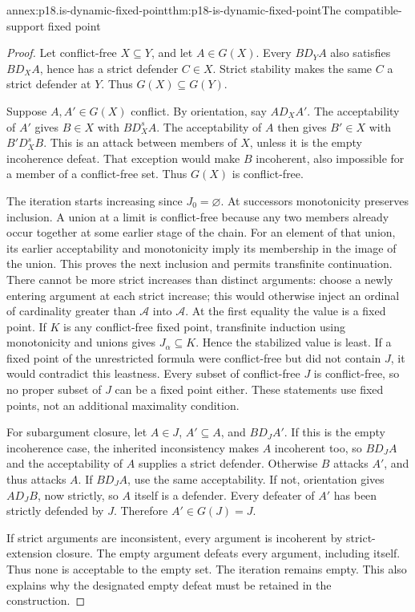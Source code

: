 \begin{annexitem}{annex:p18.is-dynamic-fixed-point}{thm:p18-is-dynamic-fixed-point}{The compatible-support fixed point}
\begin{proof}
Let conflict-free \(X\subseteq Y\), and let \(A\in G(X)\).
Every \(B D_YA\) also satisfies \(B D_XA\), hence has a
strict defender \(C\in X\). Strict stability makes the same \(C\)
a strict defender at \(Y\). Thus \(G(X)\subseteq G(Y)\).

Suppose \(A,A'\in G(X)\) conflict. By orientation, say \(A D_XA'\).
The acceptability of \(A'\) gives \(B\in X\) with \(B D_X^s A\).
The acceptability of \(A\) then gives \(B'\in X\) with
\(B'D_X^s B\). This is an attack between members of \(X\),
unless it is the empty incoherence defeat. That exception would
make \(B\) incoherent, also impossible for a member of a
conflict-free set. Thus \(G(X)\) is conflict-free.

The iteration starts increasing since \(J_0=\varnothing\).
At successors monotonicity preserves inclusion. A union at a
limit is conflict-free because any two members already occur
together at some earlier stage of the chain. For an element of
that union, its earlier acceptability and monotonicity imply its
membership in the image of the union. This proves the next
inclusion and permits transfinite continuation.
There cannot be more strict increases than distinct arguments:
choose a newly entering argument at each strict increase;
this would otherwise inject an ordinal of cardinality greater
than \(\mathcal A\) into \(\mathcal A\).
At the first equality the value is a fixed point.
If \(K\) is any conflict-free fixed point, transfinite induction
using monotonicity and unions gives \(J_\alpha\subseteq K\).
Hence the stabilized value is least.
If a fixed point of the unrestricted formula were conflict-free
but did not contain \(J\), it would contradict this leastness.
Every subset of conflict-free \(J\) is conflict-free, so no proper
subset of \(J\) can be a fixed point either. These statements use
fixed points, not an additional maximality condition.

For subargument closure, let \(A\in J\), \(A'\subseteq A\),
and \(B D_JA'\). If this is the empty incoherence case, the
inherited inconsistency makes \(A\) incoherent too, so \(B D_JA\)
and the acceptability of \(A\) supplies a strict defender.
Otherwise \(B\) attacks \(A'\), and thus attacks \(A\).
If \(B D_JA\), use the same acceptability. If not, orientation
gives \(A D_JB\), now strictly, so \(A\) itself is a defender.
Every defeater of \(A'\) has been strictly defended by \(J\).
Therefore \(A'\in G(J)=J\).

If strict arguments are inconsistent, every argument is incoherent
by strict-extension closure. The empty argument defeats every
argument, including itself. Thus none is acceptable to the empty
set. The iteration remains empty. This also explains why the
designated empty defeat must be retained in the construction.
\end{proof}
\end{annexitem}

